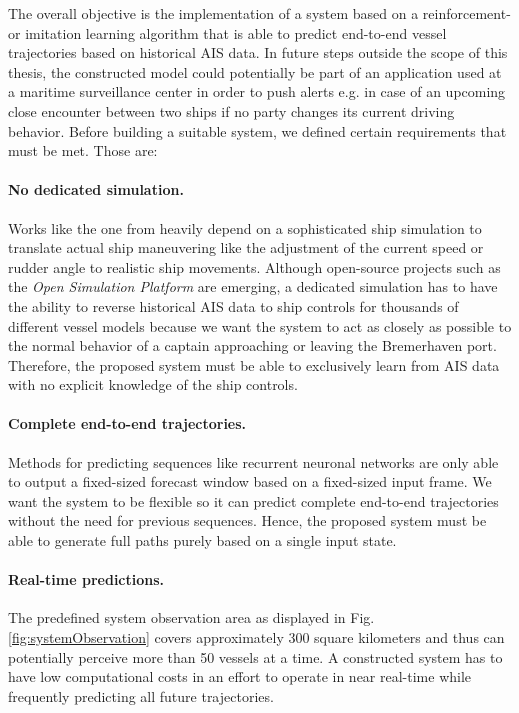 The overall objective is the implementation of a system based on a reinforcement- or imitation learning algorithm that is able to predict end-to-end vessel trajectories based on historical AIS data. In future steps outside the scope of this thesis, the constructed model could potentially be part of an application used at a maritime surveillance center in order to push alerts e.g. in case of an upcoming close encounter between two ships if no party changes its current driving behavior. Before building a suitable system, we defined certain requirements that must be met. Those are:
\paragraph{No dedicated simulation.} Works like the one from \cite{westerlund2021learning} heavily depend on a sophisticated ship simulation to translate actual ship maneuvering like the adjustment of the current speed or rudder angle to realistic ship movements. Although open-source projects such as the \textit{Open Simulation Platform} \cite[]{smogeli2020open} are emerging, a dedicated simulation has to have the ability to reverse historical AIS data to ship controls for thousands of different vessel models because we want the system to act as closely as possible to the normal behavior of a captain approaching or leaving the Bremerhaven port. Therefore, the proposed system must be able to exclusively learn from AIS data with no explicit knowledge of the ship controls.

\paragraph{Complete end-to-end trajectories.}
Methods for predicting sequences like recurrent neuronal networks are only able to output a fixed-sized forecast window based on a fixed-sized input frame. We want the system to be flexible so it can predict complete end-to-end trajectories without the need for previous sequences. Hence, the proposed system must be able to generate full paths purely based on a single input state.

\paragraph{Real-time predictions.} The predefined system observation area as displayed in Fig. \ref{fig:systemObservation} covers approximately 300 square kilometers and thus can potentially perceive more than 50 vessels at a time. A constructed system has to have low computational costs in an effort to operate in near real-time while frequently predicting all future trajectories.


